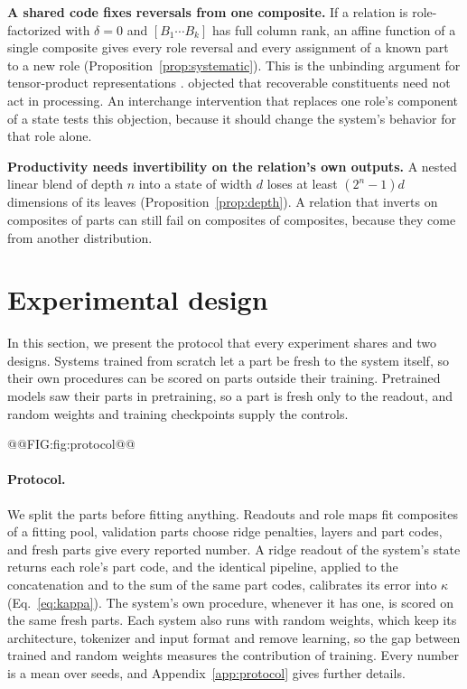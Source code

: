 \textbf{A shared code fixes reversals from one composite.} If a relation is role-factorized with $\delta = 0$ and $[B_1 \cdots B_k]$ has full column rank, an affine function of a single composite gives every role reversal and every assignment of a known part to a new role (Proposition~\ref{prop:systematic}). This is the unbinding argument for tensor-product representations \citep{smolensky1990}. \citet{fodor1990} objected that recoverable constituents need not act in processing. An interchange intervention that replaces one role's component of a state tests this objection, because it should change the system's behavior for that role alone.

\textbf{Productivity needs invertibility on the relation's own outputs.} A nested linear blend of depth $n$ into a state of width $d$ loses at least $(2^n - 1)d$ dimensions of its leaves (Proposition~\ref{prop:depth}). A relation that inverts on composites of parts can still fail on composites of composites, because they come from another distribution.

\section{Experimental design}
\label{sec:experiments}

In this section, we present the protocol that every experiment shares and two designs. Systems trained from scratch let a part be fresh to the system itself, so their own procedures can be scored on parts outside their training. Pretrained models saw their parts in pretraining, so a part is fresh only to the readout, and random weights and training checkpoints supply the controls.

@@FIG:fig:protocol@@

\paragraph{Protocol.} We split the parts before fitting anything. Readouts and role maps fit composites of a fitting pool, validation parts choose ridge penalties, layers and part codes, and fresh parts give every reported number. A ridge readout of the system's state returns each role's part code, and the identical pipeline, applied to the concatenation and to the sum of the same part codes, calibrates its error into $\kappa$ (Eq.~\ref{eq:kappa}). The system's own procedure, whenever it has one, is scored on the same fresh parts. Each system also runs with random weights, which keep its architecture, tokenizer and input format and remove learning, so the gap between trained and random weights measures the contribution of training. Every number is a mean over seeds, and Appendix~\ref{app:protocol} gives further details.


